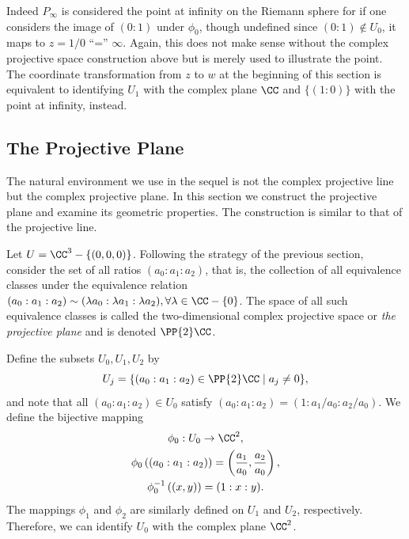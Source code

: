 Indeed $P_\infty$ is considered the point at infinity on the Riemann
sphere for if one considers the image of $(0 : 1)$ under $\phi_0$,
though undefined since $(0:1) \not \in U_0$, it maps to $z = 1 / 0$
``='' $\infty$. Again, this does not make sense without the complex
projective space construction above but is merely used to illustrate the
point. The coordinate transformation from $z$ to $w$ at the beginning of
this section is equivalent to identifying $U_1$ with the complex plane
$\CC$ and $\{(1 : 0)\}$ with the point at infinity, instead.

\subsection{The Projective Plane}

The natural environment we use in the sequel is not the complex
projective line but the complex projective plane. In this section we
construct the projective plane and examine its geometric properties. The
construction is similar to that of the projective line.

Let $U = \CC^3 - \{(0,0,0)\}$. Following the strategy of the previous
section, consider the set of all ratios $(a_0 : a_1 : a_2)$, that is,
the collection of all equivalence classes under the equivalence relation
$(a_0 : a_1 : a_2) \sim (\lambda a_0 : \lambda a_1 : \lambda a_2),
\forall \lambda \in \CC - \{0\}$. The space of all such equivalence
classes is called the two-dimensional complex projective space or {\it
  the projective plane} and is denoted $\PP{2}\CC$.

Define the subsets $U_0,U_1,U_2$ by
\[
    U_j = \{ (a_0 : a_1 : a_2) \in \PP{2}\CC \; | \; a_j \neq 0 \},
\]
and note that all $(a_0 : a_1 : a_2) \in U_0$ satisfy $(a_0 : a_1 : a_2)
= (1 : a_1/a_0 : a_2/a_0)$. We define the bijective mapping
\begin{gather*}
    \phi_0 : U_0 \to \CC^2, \\
    \phi_0 \left( (a_0 : a_1 : a_2) \right)
    =
    \left( \frac{a_1}{a_0}, \frac{a_2}{a_0} \right), \\
    \phi_0^{-1} \left( (x,y) \right)
    =
    (1 : x : y).
\end{gather*}
The mappings $\phi_1$ and $\phi_2$ are similarly defined on $U_1$ and
$U_2$, respectively. Therefore, we can identify $U_0$ with the complex
plane $\CC^2$.

